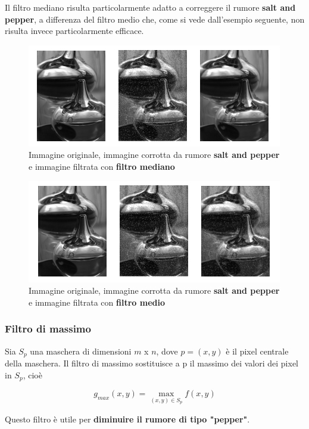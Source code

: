 Il filtro mediano risulta particolarmente adatto a correggere il rumore
\textbf{salt and pepper}, a differenza del filtro medio che, come si vede
dall'esempio seguente, non risulta invece particolarmente efficace.

\begin{figure}[H]
    \centering
    \includegraphics[keepaspectratio]{capitoli/immagini/imgs/esempio-filtro-mediano.png}
    \caption{Immagine originale, immagine corrotta da rumore \textbf{salt and
            pepper} e immagine filtrata con \textbf{filtro mediano}}
\end{figure}
\begin{figure}[H]
    \centering
    \includegraphics[keepaspectratio]{capitoli/immagini/imgs/esempio-filtro-medio.png}
    \caption{Immagine originale, immagine corrotta da rumore \textbf{salt and
            pepper} e immagine filtrata con \textbf{filtro medio}}
\end{figure}

\subsubsection{Filtro di massimo}

Sia $S_p$ una maschera di dimensioni $m $ x $n$, dove $p = (x,y)$ è il pixel
centrale della maschera. Il filtro di massimo sostituisce a p il massimo dei
valori dei pixel in $S_p$, cioè

$$
    g_{max}(x,y)= \max_{(x,y) \in S_p} f(x,y)
$$

Questo filtro è utile per \textbf{diminuire il rumore di tipo "pepper"}.

